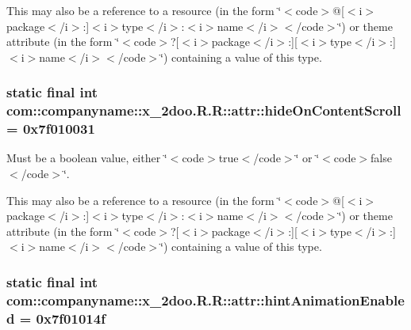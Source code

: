 This may also be a reference to a resource (in the form \char`\"{}$<$code$>$@\mbox{[}$<$i$>$package$<$/i$>$:\mbox{]}$<$i$>$type$<$/i$>$:$<$i$>$name$<$/i$>$$<$/code$>$\char`\"{}) or theme attribute (in the form \char`\"{}$<$code$>$?\mbox{[}$<$i$>$package$<$/i$>$:\mbox{]}\mbox{[}$<$i$>$type$<$/i$>$:\mbox{]}$<$i$>$name$<$/i$>$$<$/code$>$\char`\"{}) containing a value of this type. \hypertarget{classcom_1_1companyname_1_1x__2doo_1_1_r_1_1attr_72dd62d92e4115df934fb0e41b37b0ac}{
\subsubsection[{hideOnContentScroll}]{\setlength{\rightskip}{0pt plus 5cm}static final int com::companyname::x\_\-2doo.R.R::attr::hideOnContentScroll = 0x7f010031}}
\label{classcom_1_1companyname_1_1x__2doo_1_1_r_1_1attr_72dd62d92e4115df934fb0e41b37b0ac}


Must be a boolean value, either \char`\"{}$<$code$>$true$<$/code$>$\char`\"{} or \char`\"{}$<$code$>$false$<$/code$>$\char`\"{}. 

This may also be a reference to a resource (in the form \char`\"{}$<$code$>$@\mbox{[}$<$i$>$package$<$/i$>$:\mbox{]}$<$i$>$type$<$/i$>$:$<$i$>$name$<$/i$>$$<$/code$>$\char`\"{}) or theme attribute (in the form \char`\"{}$<$code$>$?\mbox{[}$<$i$>$package$<$/i$>$:\mbox{]}\mbox{[}$<$i$>$type$<$/i$>$:\mbox{]}$<$i$>$name$<$/i$>$$<$/code$>$\char`\"{}) containing a value of this type. \hypertarget{classcom_1_1companyname_1_1x__2doo_1_1_r_1_1attr_54192e5bf6506b5933feec17a73c2b76}{
\subsubsection[{hintAnimationEnabled}]{\setlength{\rightskip}{0pt plus 5cm}static final int com::companyname::x\_\-2doo.R.R::attr::hintAnimationEnabled = 0x7f01014f}}
\label{classcom_1_1companyname_1_1x__2doo_1_1_r_1_1attr_54192e5bf6506b5933feec17a73c2b76}



